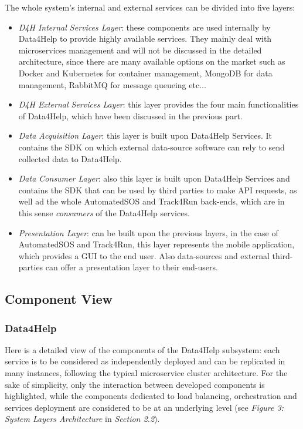 The whole system's internal and external services can be divided into five layers:
\begin{itemize}
	\item \textit{D4H Internal Services Layer}: these components are used internally by Data4Help to provide highly available services. They mainly deal with microservices management and will not be discussed in the detailed architecture, since there are many available options on the market such as Docker and Kubernetes for container management, MongoDB for data management, RabbitMQ for message queueing etc...
	
	\item \textit{D4H External Services Layer}: this layer provides the four main functionalities of Data4Help, which have been discussed in the previous part.
	
	\item \textit{Data Acquisition Layer}: this layer is built upon Data4Help Services. It contains the SDK on which external data-source software can rely to send collected data to Data4Help.
	
	\item \textit{Data Consumer Layer}: also this layer is built upon Data4Help Services and contains the SDK that can be used by third parties to make API requests, as well ad the whole AutomatedSOS and Track4Run back-ends, which are in this sense \textit{consumers} of the Data4Help services.
	
	\item \textit{Presentation Layer}: can be built upon the previous layers, in the case of AutomatedSOS and Track4Run, this layer represents the mobile application, which provides a GUI to the end user. Also data-sources and external third-parties can offer a presentation layer to their end-users.
\end{itemize}


\subsection{Component View}


\subsubsection{Data4Help}

Here is a detailed view of the components of the Data4Help subsystem: each service is to be considered as independently deployed and can be replicated in many instances, following the typical microservice cluster architecture. For the sake of simplicity, only the interaction between developed components is highlighted, while the components dedicated to load balancing, orchestration and services deployment are considered to be at an underlying level (see \textit{Figure 3: System Layers Architecture} in \textit{Section 2.2}).


